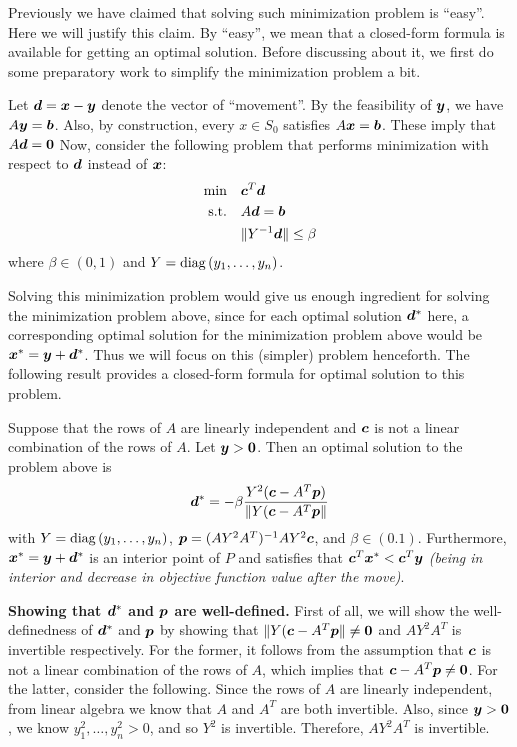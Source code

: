\begin{enumerate}
Previously we have claimed that solving such minimization problem is “easy”.
Here we will justify this claim. By “easy”, we mean that a closed-form formula
is available for getting an optimal solution.  Before discussing about it, we
first do some preparatory work to simplify the minimization problem a bit.

Let \(\bm{d}=\bm{x}-\bm{y}\) denote the vector of “movement”. By the
feasibility of \(\bm{y}\), we have \(A\bm{y}=\bm{b}\). Also, by
construction, every \(x\in S_0\) satisfies \(A\bm{x}=\bm{b}\). These imply
that \(A\bm{d}=\bm{0}\) Now, consider the following problem that performs
minimization with respect to \(\bm{d}\) instead of \(\bm{x}\):
\begin{align*}
\text{min}\quad&\bm{c}^{T}\bm{d} \\
\text{s.t.}\quad&A\bm{d}=\bm{b} \\
&\|Y^{-1}\bm{d}\|\le\beta
\end{align*}
where \(\beta\in (0,1)\) and \(Y=\operatorname{diag}\left(y_1,\dotsc,y_n\right)\).

Solving this minimization problem would give us enough ingredient for solving
the minimization problem above, since for each optimal solution
\(\bm{d}^{*}\) here, a corresponding optimal solution for the minimization
problem above would be \(\bm{x}^{*}=\bm{y}+\bm{d}^{*}\). Thus we will
focus on this (simpler) problem henceforth.  The following result provides a
closed-form formula for optimal solution to this problem.

\begin{proposition}
\label{prp:min-ellip-closed-form}
Suppose that the rows of \(A\) are linearly independent and \(\bm{c}\) is not
a linear combination of the rows of \(A\). Let \(\bm{y}>\bm{0}\). Then an
optimal solution to the problem above is
\[
\bm{d}^{*}=-\beta\frac{Y^{2}(\bm{c}-A^{T}\bm{p})}{\|Y(\bm{c}-A^{T}\bm{p}\|}
\]
with \(Y=\operatorname{diag}\left(y_1,\dotsc,y_n\right)\),
\(\bm{p}=(AY^{2}A^{T})^{-1}AY^{2}\bm{c}\), and \(\beta\in (0.1)\).
Furthermore, \(\bm{x}^{*}=\bm{y}+\bm{d}^{*}\) is an interior point of
\(P\) and satisfies that \(\bm{c}^{T}\bm{x}^{*}<\bm{c}^{T}\bm{y}\)
\emph{(being in interior and decrease in objective function value after the
move)}.
\end{proposition}
\begin{pf}
\textbf{Showing that \(\bm{d}^{*}\) and \(\bm{p}\) are well-defined.} First
of all, we will show the well-definedness of \(\bm{d}^{*}\) and \(\bm{p}\)
by showing that \(\|Y(\bm{c}-A^{T}\bm{p}\|\ne\bm{0}\) and \(AY^{2}A^{T}\)
is invertible respectively. For the former, it follows from the assumption that
\(\bm{c}\) is not a linear combination of the rows of \(A\), which implies that \(\bm{c}-A^{T}\bm{p}\ne\bm{0}\). For the latter, consider the following. Since the rows of \(A\) are linearly
independent, from linear algebra we know that \(A\) and \(A^{T}\) are both invertible.
Also, since \(\bm{y}>\bm{0}\), we know \(y_1^{2},\dotsc,y_n^{2}>0\), and so
\(Y^{2}\) is invertible. Therefore, \(AY^{2}A^{T}\) is invertible.


\end{pf}
\end{enumerate}
